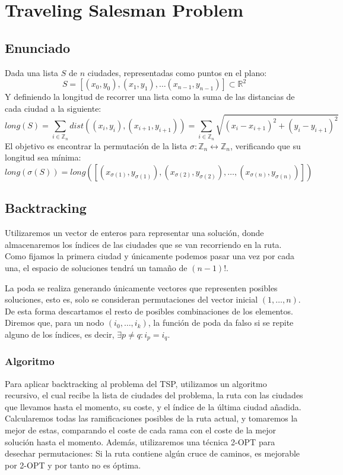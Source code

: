 \documentclass[a4paper, 11pt]{article} %
\begin{document}
\section{Traveling Salesman Problem}
  \subsection{Enunciado}
    Dada una lista $S$ de $n$ ciudades, representadas como puntos en el plano:
    \begin{equation}
      S = [(x_0,y_0), (x_1,y_1), \dots (x_{n-1},y_{n-1})] \subset \mathbb{R}^2
    \end{equation}
    Y definiendo la longitud de recorrer una lista como la suma de las distancias de cada ciudad a la siguiente:
    \begin{equation}
     long(S) = \sum_{i \in \mathbb{Z}_n} dist((x_i,y_i), (x_{i+1}, y_{i+1})) = \sum_{i \in \mathbb{Z}_n} \sqrt{(x_i-x_{i+1})^2 + (y_i-y_{i+1})^2}
    \end{equation}
    El objetivo es encontrar la permutación de la lista $\sigma : \mathbb{Z}_n \leftrightarrow \mathbb{Z}_n$, verificando que su longitud sea mínima:
    \begin{equation}
     long(\sigma(S)) = long([(x_{\sigma(1)},y_{\sigma(1)}), (x_{\sigma(2)},y_{\sigma(2)}), \dots, (x_{\sigma(n)},y_{\sigma(n)})])
    \end{equation}
    
  \subsection{Backtracking}
  
  
  Utilizaremos un vector de enteros para representar una solución, donde almacenaremos los índices de las ciudades que se van recorriendo en la ruta. Como fijamos la primera ciudad y únicamente podemos pasar una vez por cada una, el espacio de soluciones tendrá un tamaño de $(n-1)!$.
  
  La poda se realiza generando únicamente vectores que representen posibles soluciones, esto es, solo se consideran permutaciones del vector inicial $(1,\dots,n)$. De esta forma descartamos el resto de posibles combinaciones de los elementos. Diremos que, para un nodo $(i_0, \dots, i_k)$, la función de poda da falso si se repite alguno de los índices, es decir, $\exists p\ne q : i_p = i_q$.
  
  
    \subsubsection{Algoritmo}
      Para aplicar backtracking al problema del TSP, utilizamos un algoritmo recursivo, el cual recibe la lista de 
      ciudades del problema, la ruta con las ciudades que llevamos hasta el momento, su coste, y el índice de la 
      última ciudad añadida. Calcularemos todas las ramificaciones posibles de la ruta actual, y tomaremos la mejor 
      de estas, comparando el coste de cada rama con el coste de la mejor solución hasta el momento. Además, 
      utilizaremos una técnica 2-OPT para desechar permutaciones: Si la ruta contiene algún cruce de caminos, es 
      mejorable por 2-OPT y por tanto no es óptima. 
  
\end{document}
